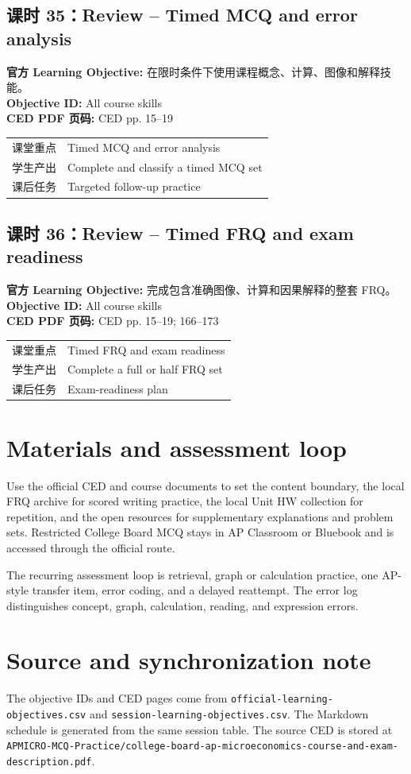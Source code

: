 \documentclass[11pt,a4paper]{ctexart}
\newcommand{\objectivebox}[1]{\noindent\colorbox{aplight}{\parbox{0.96\textwidth}{#1}}}
\newcommand{\codepath}[1]{\texttt{\small #1}}
\begin{document}
\subsection{课时 35：Review -- Timed MCQ and error analysis}
\objectivebox{\textbf{官方 Learning Objective:} 在限时条件下使用课程概念、计算、图像和解释技能。\\\textbf{Objective ID:} All course skills\\\textbf{CED PDF 页码:} CED pp. 15–19}\par\vspace{0.4em}
\begin{tabularx}{\textwidth}{p{3.0cm}Y}
\toprule
课堂重点 & Timed MCQ and error analysis\\
学生产出 & Complete and classify a timed MCQ set\\
课后任务 & Targeted follow-up practice\\
\bottomrule
\end{tabularx}
\subsection{课时 36：Review -- Timed FRQ and exam readiness}
\objectivebox{\textbf{官方 Learning Objective:} 完成包含准确图像、计算和因果解释的整套 FRQ。\\\textbf{Objective ID:} All course skills\\\textbf{CED PDF 页码:} CED pp. 15–19; 166–173}\par\vspace{0.4em}
\begin{tabularx}{\textwidth}{p{3.0cm}Y}
\toprule
课堂重点 & Timed FRQ and exam readiness\\
学生产出 & Complete a full or half FRQ set\\
课后任务 & Exam-readiness plan\\
\bottomrule
\end{tabularx}
\section{Materials and assessment loop}
Use the official CED and course documents to set the content boundary, the local FRQ archive for scored writing practice, the local Unit HW collection for repetition, and the open resources for supplementary explanations and problem sets. Restricted College Board MCQ stays in AP Classroom or Bluebook and is accessed through the official route.

The recurring assessment loop is retrieval, graph or calculation practice, one AP-style transfer item, error coding, and a delayed reattempt. The error log distinguishes concept, graph, calculation, reading, and expression errors.

\section{Source and synchronization note}
The objective IDs and CED pages come from \codepath{official-learning-objectives.csv} and \codepath{session-learning-objectives.csv}. The Markdown schedule is generated from the same session table. The source CED is stored at \codepath{APMICRO-MCQ-Practice/college-board-ap-microeconomics-course-and-exam-description.pdf}.
\end{document}
